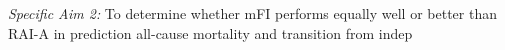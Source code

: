 \emph{Specific Aim 2:} To determine whether mFI performs equally well or better than RAI-A in prediction all-cause mortality and transition from indep